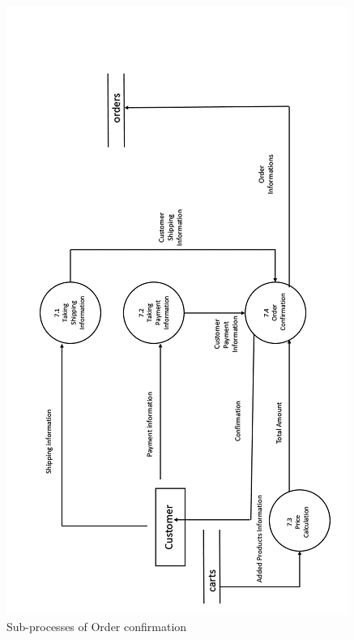 \begin{figure}
 \centering
\includegraphics{figures/7final.png}
\caption{Sub-processes of  Order confirmation}
\end{figure}

